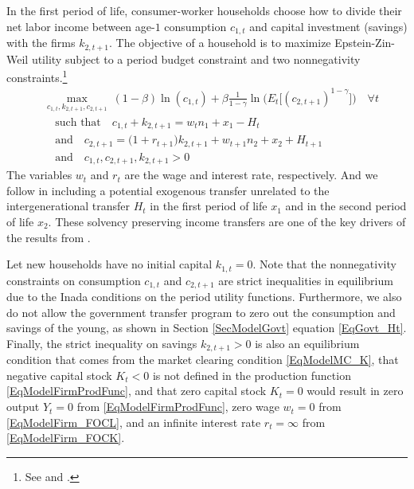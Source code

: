 \documentclass[letterpaper,12pt]{article}
\theoremstyle{definition}
\begin{document}
\begin{spacing}{1.5}
    In the first period of life, consumer-worker households choose how to divide their net labor income between age-$1$ consumption $c_{1,t}$ and capital investment (savings) with the firms $k_{2,t+1}$. The objective of a household is to maximize Epstein-Zin-Weil utility subject to a period budget constraint and two nonnegativity constraints.\footnote{See \citet{EpsteinZin:2013} and \citet{Weil:1990}.}
    \begin{align}
      &\max_{c_{1,t},k_{2,t+1},c_{2,t+1}}\: (1-\beta)\ln(c_{1,t}) + \beta\frac{1}{1-\gamma}\ln\Bigr(E_t\bigl[(c_{2,t+1})^{1-\gamma}\bigr]\Bigr) \quad \forall t \label{EqHHmaxUtil} \\
      &\quad\text{such that}\quad c_{1,t} + k_{2,t+1} = w_t n_1 + x_1 - H_t \label{EqHHbc1} \\
      &\quad\text{and}\quad c_{2,t+1} = \bigl(1+r_{t+1}\bigr)k_{2,t+1} + w_{t+1}n_2 + x_2 + H_{t+1} \label{EqHHbc2} \\
      &\quad\text{and}\quad c_{1,t},c_{2,t+1},k_{2,t+1} > 0 \label{EqHHnonneg}
    \end{align}
    The variables $w_t$ and $r_t$ are the wage and interest rate, respectively. And we follow \citet{Blanchard:2019} in including a potential exogenous transfer unrelated to the intergenerational transfer $H_t$ in the first period of life $x_1$ and in the second period of life $x_2$. These solvency preserving income transfers are one of the key drivers of the results from \cite{Blanchard:2019}.

    Let new households have no initial capital $k_{1,t} = 0$. Note that the nonnegativity constraints on consumption $c_{1,t}$ and $c_{2,t+1}$ are strict inequalities in equilibrium due to the Inada conditions on the period utility functions. Furthermore, we also do not allow the government transfer program to zero out the consumption and savings of the young, as shown in Section \ref{SecModelGovt} equation \eqref{EqGovt_Ht}. Finally, the strict inequality on savings $k_{2,t+1}>0$ is also an equilibrium condition that comes from the market clearing condition \eqref{EqModelMC_K}, that negative capital stock $K_t<0$ is not defined in the production function \eqref{EqModelFirmProdFunc}, and that zero capital stock $K_t=0$ would result in zero output $Y_t=0$ from \eqref{EqModelFirmProdFunc}, zero wage $w_t=0$ from \eqref{EqModelFirm_FOCL}, and an infinite interest rate $r_t=\infty$ from \eqref{EqModelFirm_FOCK}.


\end{spacing}
\end{document}
